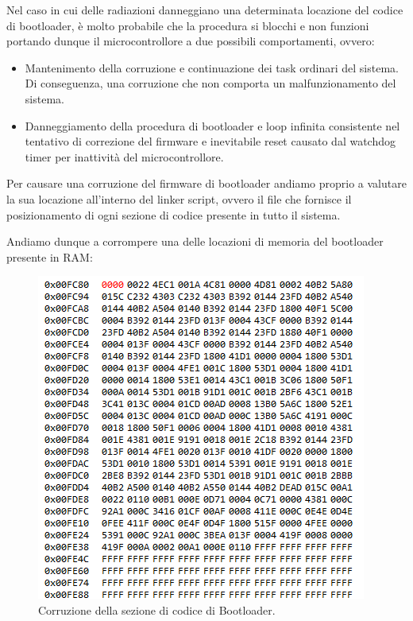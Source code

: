 \documentclass[LaM,binding=0.6cm]{../sapthesis}
\begin{document}
\newline
Nel caso in cui delle radiazioni danneggiano una determinata locazione del codice di bootloader, è molto probabile che la procedura si blocchi e non funzioni portando dunque il microcontrollore
a due possibili comportamenti, ovvero:
\begin{itemize}
    \item Mantenimento della corruzione e continuazione dei task ordinari del sistema. Di conseguenza, una corruzione che non comporta un malfunzionamento del sistema.
    \item Danneggiamento della procedura di bootloader e loop infinita consistente nel tentativo di correzione del firmware e inevitabile reset causato dal watchdog timer per inattività del microcontrollore.
\end{itemize}


Per causare una corruzione del firmware di bootloader andiamo proprio a valutare la sua locazione all'interno del linker script, ovvero il file che fornisce il posizionamento di ogni sezione di codice presente in tutto il sistema.

Andiamo dunque a corrompere una delle locazioni di memoria del bootloader presente in RAM:

\begin{figure}[htbp]
\centerline{\includegraphics[scale=0.64]{examples/BootloaderCorruption.PNG}}
\caption{Corruzione della sezione di codice di Bootloader.}
\label{fig}
\end{figure}
\newline
\end{document}
